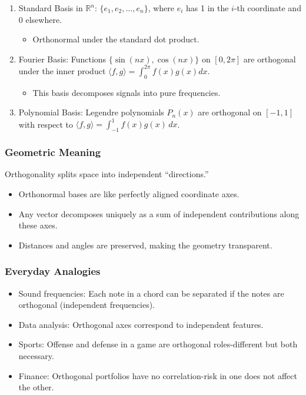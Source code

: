 \documentclass[
  letterpaper,
  DIV=11,
  numbers=noendperiod]{scrreprt}
\providecommand{\tightlist}{%
  \setlength{\itemsep}{0pt}\setlength{\parskip}{0pt}}
\begin{document}
\begin{enumerate}
\def\labelenumi{\arabic{enumi}.}
\item
  Standard Basis in \(\mathbb{R}^n\): \(\{e_1, e_2, \dots, e_n\}\),
  where \(e_i\) has 1 in the \(i\)-th coordinate and 0 elsewhere.

  \begin{itemize}
  \tightlist
  \item
    Orthonormal under the standard dot product.
  \end{itemize}
\item
  Fourier Basis: Functions \(\{\sin(nx), \cos(nx)\}\) on \([0,2\pi]\)
  are orthogonal under the inner product
  \(\langle f,g\rangle = \int_0^{2\pi} f(x)g(x)dx\).

  \begin{itemize}
  \tightlist
  \item
    This basis decomposes signals into pure frequencies.
  \end{itemize}
\item
  Polynomial Basis: Legendre polynomials \(P_n(x)\) are orthogonal on
  \([-1,1]\) with respect to
  \(\langle f,g\rangle = \int_{-1}^1 f(x)g(x)\,dx\).
\end{enumerate}

\subsubsection{Geometric Meaning}\label{geometric-meaning-18}

Orthogonality splits space into independent ``directions.''

\begin{itemize}
\tightlist
\item
  Orthonormal bases are like perfectly aligned coordinate axes.
\item
  Any vector decomposes uniquely as a sum of independent contributions
  along these axes.
\item
  Distances and angles are preserved, making the geometry transparent.
\end{itemize}

\subsubsection{Everyday Analogies}\label{everyday-analogies-68}

\begin{itemize}
\tightlist
\item
  Sound frequencies: Each note in a chord can be separated if the notes
  are orthogonal (independent frequencies).
\item
  Data analysis: Orthogonal axes correspond to independent features.
\item
  Sports: Offense and defense in a game are orthogonal roles-different
  but both necessary.
\item
  Finance: Orthogonal portfolios have no correlation-risk in one does
  not affect the other.
\end{itemize}
\end{document}
